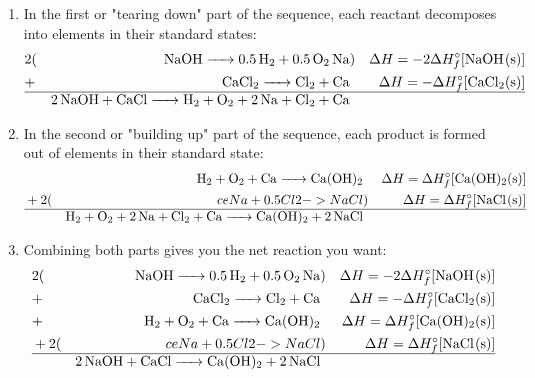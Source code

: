 \documentclass{article}  %
\begin{document}
\begin{enumerate}
    \item In the first or "tearing down" part of the sequence, each reactant decomposes into elements in their standard states:
        \begin{equation*}
            \begin{aligned}
                &2(& \ce{NaOH -> 0.5 H2 + 0.5 O2 Na } &) & \Delta H = -2\Delta H^\circ_f [\ce{NaOH_(s)}] \\
                &+ & \ce{CaCl2 -> Cl2 + Ca }          &  &  \Delta H = -\Delta H^\circ_f [\ce{CaCl2_(s)}] \\  
                \hline
                  &&\ce{2 NaOH + CaCl -> H2 + O2 + 2 Na + Cl2 + Ca}&&
            \end{aligned}
        \end{equation*}
    \item In the second or "building up" part of the sequence, each product is formed out of elements in their standard state:
        \begin{equation*}
            \begin{aligned}
                && \ce{H2 + O2 + Ca -> Ca(OH)2} & & \Delta H = \Delta H^\circ_f [\ce{Ca(OH)2_(s)}] \\
                &+2(& ce{Na + 0.5 Cl2 -> NaCl} &)  &  \Delta H = \Delta H^\circ_f [\ce{NaCl_(s)}] \\  
                \hline
                &&\ce{H2 + O2 + 2 Na + Cl2 + Ca -> Ca(OH)2 + 2 NaCl}&&
            \end{aligned}
        \end{equation*}
    \item Combining both parts gives you the net reaction you want:
    \begin{equation*}
        \begin{aligned}
            &2(& \ce{NaOH -> 0.5 H2 + 0.5 O2 Na } &) & \Delta H = -2\Delta H^\circ_f [\ce{NaOH_(s)}] \\
            &+ & \ce{CaCl2 -> Cl2 + Ca }          &  &  \Delta H = -\Delta H^\circ_f [\ce{CaCl2_(s)}] \\ 
            &+ & \ce{H2 + O2 + Ca -> Ca(OH)2} & & \Delta H = \Delta H^\circ_f [\ce{Ca(OH)2_(s)}] \\
            &+2(& ce{Na + 0.5 Cl2 -> NaCl} &)  &  \Delta H = \Delta H^\circ_f [\ce{NaCl_(s)}] \\   
            \hline
            &&\ce{2 NaOH + CaCl -> Ca(OH)2 + 2 NaCl}&&
        \end{aligned}
    \end{equation*}
\end{enumerate}
\end{document}
